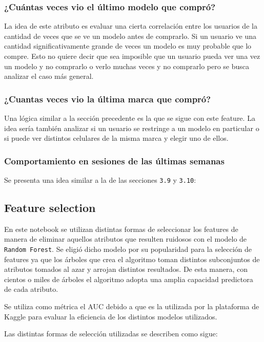 \documentclass[a4paper]{article}
\begin{document}
\subsubsection{¿Cuántas veces vio el último modelo que compró?}
La idea de este atributo es evaluar una cierta correlación entre los usuarios de la cantidad de veces que se ve un modelo antes de comprarlo. Si un usuario ve una cantidad significativamente grande de veces un modelo es muy probable que lo compre. Esto no quiere decir que sea imposible que un usuario pueda ver una vez un modelo y no comprarlo o verlo muchas veces y no comprarlo pero se busca analizar el caso más general.

\subsubsection{¿Cuantas veces vio la última marca que compró?}
Una lógica similar a la sección precedente es la que se sigue con este feature. La idea sería también analizar si un usuario se restringe a un modelo en particular o si puede ver distintos celulares de la misma marca y elegir uno de ellos.

\subsubsection{Comportamiento en sesiones de las últimas semanas}

Se presenta una idea similar a la de las secciones \texttt{3.9} y \texttt{3.10}:


\subsection{Feature selection}

En este notebook se utilizan distintas formas de seleccionar los features de manera de eliminar aquellos atributos que resulten ruidosos con el modelo de \texttt{Random Forest}. Se eligió dicho modelo por su popularidad para la selección de features ya que los árboles que crea el algoritmo toman distintos subconjuntos de atributos tomados al azar y arrojan distintos resultados. De esta manera, con cientos o miles de árboles el algoritmo adopta una amplia capacidad predictora de cada atributo.

Se utiliza como métrica el AUC debido a que es la utilizada por la plataforma de Kaggle para evaluar la eficiencia de los distintos modelos utilizados. 

Las distintas formas de selección utilizadas se describen como sigue:
\end{document}
